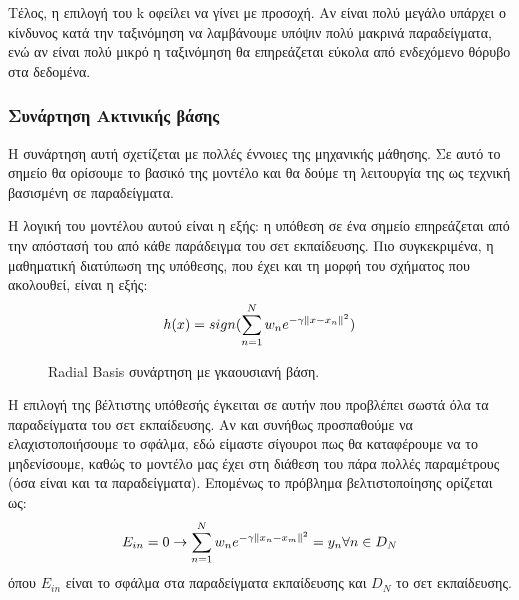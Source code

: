 Τέλος, η επιλογή του k οφείλει να γίνει με προσοχή. Αν είναι πολύ μεγάλο υπάρχει ο κίνδυνος κατά την ταξινόμηση να λαμβάνουμε υπόψιν πολύ μακρινά παραδείγματα, ενώ αν είναι πολύ μικρό η ταξινόμηση θα επηρεάζεται εύκολα από ενδεχόμενο θόρυβο στα δεδομένα.
\subsubsection{Συνάρτηση Ακτινικής βάσης }
Η συνάρτηση αυτή σχετίζεται με πολλές έννοιες της μηχανικής μάθησης. Σε αυτό το σημείο θα ορίσουμε το βασικό της μοντέλο και θα δούμε τη λειτουργία της ως τεχνική βασισμένη σε παραδείγματα. 

Η λογική του  μοντέλου αυτού είναι η εξής: η υπόθεση σε ένα σημείο επηρεάζεται από την απόστασή του από κάθε παράδειγμα του σετ εκπαίδευσης. Πιο συγκεκριμένα, η μαθηματική διατύπωση της υπόθεσης, που έχει και τη μορφή του σχήματος που ακολουθεί, είναι η εξής:
\begin{equation}
h(x)= sign( \sum_{n=1}^{N} w_n e^{-\gamma \left\lVert x - x_n\right\rVert^2})
\end{equation}
\begin{figure}[H]
	\centering			
	\caption[Radial Basis συνάρτηση με γκαουσιανή βάση]{Radial Basis συνάρτηση με γκαουσιανή βάση.}
\end{figure}
Η επιλογή της βέλτιστης υπόθεσής έγκειται σε αυτήν που προβλέπει σωστά όλα τα παραδείγματα του σετ εκπαίδευσης. Αν και συνήθως προσπαθούμε να ελαχιστοποιήσουμε το σφάλμα, εδώ είμαστε σίγουροι πως θα καταφέρουμε να το μηδενίσουμε, καθώς το μοντέλο μας έχει στη διάθεση του πάρα πολλές παραμέτρους (όσα είναι και τα παραδείγματα). Επομένως το πρόβλημα βελτιστοποίησης ορίζεται ως:
\begin{equation}
E_{in}=0 \rightarrow  \sum_{n=1}^{N} w_n e^{-\gamma \left\lVert x_n - x_m\right\rVert^2}= y_n  \forall n \in D_N 
\end{equation}
όπου $E_{in}$ είναι το σφάλμα στα παραδείγματα εκπαίδευσης και $D_N$ το σετ εκπαίδευσης. 

